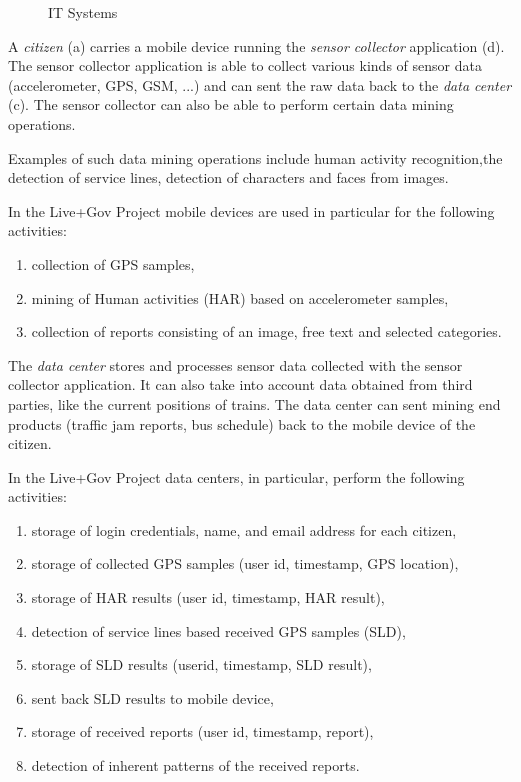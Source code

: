 \documentclass[runningheads,a4paper]{llncs}
\newenvironment{LGContent}
{ \par\color{blue} \it \small }
{ \par }
\begin{document}
\begin{LGContent}
\begin{figure}[h]
\begin{flushleft}
\begin{itemize}
\end{itemize}
\end{flushleft}

\caption{IT Systems}
\label{figure:IT Systems}
\end{figure}

A \emph{citizen} (a) carries a mobile device running the \emph{sensor collector} application (d).
The sensor collector application is able to collect various kinds of sensor data (accelerometer, GPS, GSM, ...) and can sent the raw data back to the \emph{data center} (c).
The sensor collector can also be able to perform certain data mining operations.

Examples of such data mining operations include human activity recognition,the detection of service lines, detection of characters and faces from images.

In the Live+Gov Project mobile devices are used in particular for the following activities:
\begin{enumerate}
\item collection of GPS samples,
\item mining of Human activities (HAR) based on accelerometer samples,
\item collection of reports consisting of an image, free text and selected categories.
\end{enumerate}

The \emph{data center} stores and processes sensor data collected with the sensor collector application. It can also take into account data obtained from third parties, like the current positions of trains.
The data center can sent mining end products (traffic jam reports, bus schedule) back to the mobile device of the citizen.

In the Live+Gov Project data centers, in particular, perform the following activities:
\begin{enumerate}
\item storage of login credentials, name, and email address for each citizen,
\item storage of collected GPS samples (user id, timestamp, GPS location),
\item storage of HAR results (user id, timestamp, HAR result),
\item detection of service lines based received GPS samples (SLD),
\item storage of SLD results (userid, timestamp, SLD result),
\item sent back SLD results to mobile device,
\item storage of received reports (user id, timestamp, report),
\item detection of inherent patterns of the received reports.
\end{enumerate}


\end{LGContent}
\end{document}
